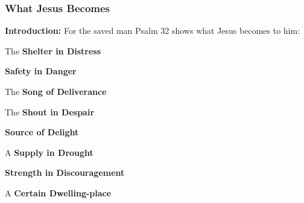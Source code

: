 \subsubsection{What Jesus Becomes}
\textbf{Introduction: }For the saved man Psalm 32 shows what Jesus becomes to him:
\begin{compactenum}[I.]
    \item The \textbf{Shelter in Distress}
    \item \textbf{Safety in Danger}
    \item The \textbf{Song of Deliverance}
    \item The \textbf{Shout in Despair}
    \item \textbf{Source of Delight}
    \item A \textbf{Supply in Drought}
    \item \textbf{Strength in Discouragement}
    \item A \textbf{Certain Dwelling-place}
\end{compactenum}
